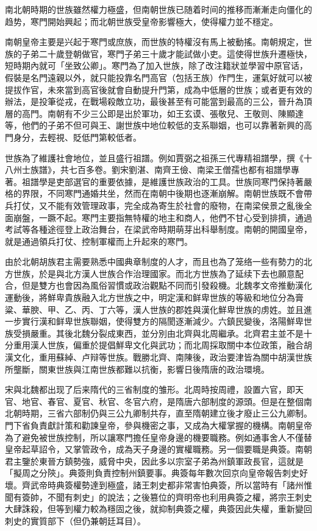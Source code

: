南北朝時期的世族雖然權力極盛，但南朝世族已随着时间的推移而漸漸走向僵化的趋势，寒門開始興起；而北朝世族受皇帝影響極大，使得權力並不穩定。

南朝皇帝主要是兴起于寒門或庶族，而世族的特權沒有馬上被動搖。南朝規定，世族的子弟二十歲登朝做官，寒門子弟三十歲才能試做小吏。這使得世族升遷極快，短時期內就可「坐致公卿」。寒門為了加入世族，除了改注籍狀並學習中原官话，假裝是名門遠親以外，就只能投靠名門高官（包括王族）作門生，運氣好就可以被提拔作官，未來當到高官後就會自動提升門第，成為中低層的世族；或者更有效的辦法，是投筆從戎，在戰場殺敵立功，最後甚至有可能當到最高的三公，晉升為頂層的高門。南朝有不少三公即是出於軍功，如王玄谟、張敬兒、王敬则、陳顯達等，他們的子弟不但可與王、謝世族中地位較低的支系聯姻，也可以靠著新興的高門身分，去輕視、貶低門第較低者。

世族為了維護社會地位，並且盛行祖譜。例如賈弼之祖孫三代專精祖譜學，撰《十八州士族譜》，共七百多卷。劉宋劉湛、南齊王儉、南梁王僧孺也都有祖譜學專著。祖譜學是吏部選官的重要依據，是維護世族政治的工具。世族同寒門保持著嚴格的界限，不同寒門通婚共坐，然而在南朝中後期也逐漸崩解。南朝世族既不會帶兵打仗，又不能有效管理政事，完全成為寄生於社會的廢物，在南梁侯景之亂後全面崩盤，一蹶不起。寒門主要指無特權的地主和商人，他們不甘心受到排擠，通過考試等各種途徑登上政治舞台，在梁武帝時期萌芽出科舉制度。南朝的開國皇帝，就是通過領兵打仗、控制軍權而上升起來的寒門。

由於北朝胡族君主需要熟悉中國典章制度的人才，而且也為了笼络一些有勢力的北方世族，於是與北方漢人世族合作治理國家。而北方世族為了延续下去也願意配合，但是雙方也會因為風俗習慣或政治觀點不同而引發殺機。北魏孝文帝推動漢化運動後，將鮮卑貴族融入北方世族之中，明定漢和鲜卑世族的等級和地位分為膏粱、華腴、甲、乙、丙、丁六等，漢人世族的郡姓與漢化鮮卑世族的虏姓。並且進一步實行漢和鲜卑世族聯姻，使得雙方的隔閡逐漸減少。六鎮民變後，洛陽鮮卑世族受損嚴重。其後北魏分裂成東西，並分別由北齊與北周繼承。北齊君主並不是十分重用漢人世族，偏重於提倡鮮卑文化與武功；而北周採取關中本位政策，融合胡漢文化，重用蘇綽、卢辩等世族。戰勝北齊、南陳後，政治要津皆為關中胡漢世族所壟斷，關東世族與江南世族都難以抗衡，影響日後隋唐的政治環境。

宋與北魏都出现了后来隋代的三省制度的雏形。北周時按周禮，設置六官，即天官、地官、春官、夏官、秋官、冬官六府，是隋唐六部制度的源頭。但是在整個南北朝時期，三省六部制仍與三公九卿制共存，直至隋朝建立後才廢止三公九卿制。門下省負責獻計策和勸諫皇帝，參與機密之事，又成為大權掌握的機構。南朝皇帝為了避免被世族控制，所以讓寒門擔任皇帝身邊的機要職務。例如通事舍人不僅替皇帝起草詔令，又掌管政令，成為天子身邊的實權職務。另一個要職是典簽。南朝君主鑒於東晉方鎮勢強，威脅中央，因此多以宗室子弟為州鎮軍政長官，這就是「擬周之分陝」。典簽則負責控制州鎮要事。典簽每年數次回京向皇帝報告刺史好壞。齊武帝時典簽權勢達到極盛，諸王刺史都非常害怕典簽，所以當時有「諸州惟聞有簽帥，不聞有刺史」的說法；之後篡位的齊明帝也利用典簽之權，將宗王刺史大肆誅殺，但等到權力較為穩固之後，就抑制典簽之權，典簽因此失權，重新變回刺史的實質部下（但仍兼朝廷耳目）。

